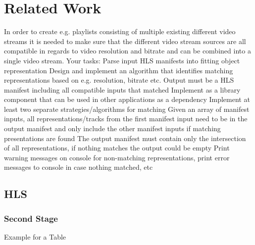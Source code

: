 \section{\textbf{Related Work }}\label{sec:relatedwork}

In order to create e.g. playlists consisting of multiple existing different video streams it is needed to make sure that the different video stream sources are all compatible in regards to video resolution and bitrate and can be combined into a single video stream.
Your tasks:
Parse input HLS manifests into fitting object representation
Design and implement an algorithm that identifies matching representations based on e.g. resolution, bitrate etc. 
Output must be a HLS manifest including all compatible inputs that matched
Implement as a library component that can be used in other applications as a dependency
Implement at least two separate strategies/algorithms for matching
Given an array of manifest inputs, all representations/tracks from the first manifest input need to be in the output manifest and only include the other manifest inputs if matching presentations are found
The output manifest must contain only the intersection of all representations, if nothing matches the output could be empty
Print warning messages on console for non-matching representations, print error messages to console in case nothing matched, etc

\subsection{HLS}\label{Start work}
\subsubsection{Second Stage}



Example for a Table 

 